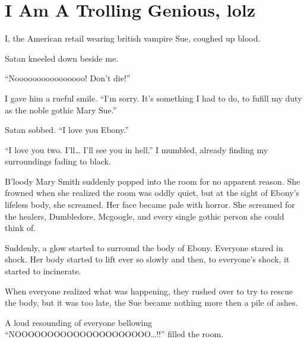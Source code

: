 \section{I Am A Trolling Genious, lolz}



I, the American retail wearing british vampire Sue, coughed up blood.

Satan kneeled down beside me.

\enquote{Noooooooooooooooo! Don't die!}

I gave him a rueful smile. \enquote{I'm sorry. It's something I had to do, to fufill my duty as the noble gothic Mary Sue.}

Satan sobbed. \enquote{I love you Ebony.}

\enquote{I love you two. I'll\ldots{} I'll see you in hell.} I mumbled, already finding my surroundings fading to black.

B'loody Mary Smith suddenly popped into the room for no apparent reason. She frowned when she realized the room was oddly quiet, but at the sight of Ebony's lifeless body, she screamed. Her face became pale with horror. She screamed for the healers, Dumbledore, Mcgoogle, and every single gothic person she could think of.

Suddenly, a glow started to surround the body of Ebony. Everyone stared in shock. Her body started to lift ever so slowly and then, to everyone's shock, it started to incinerate.

When everyone realized what was happening, they rushed over to try to rescue the body, but it was too late, the Sue became nothing more then a pile of ashes.

A loud resounding of everyone bellowing \enquote{NOOO\-O\-O\-O\-O\-O\-O\-O\-O\-O\-O\-O\-O\-O\-OOOOO\ldots{}!!} filled the room.

